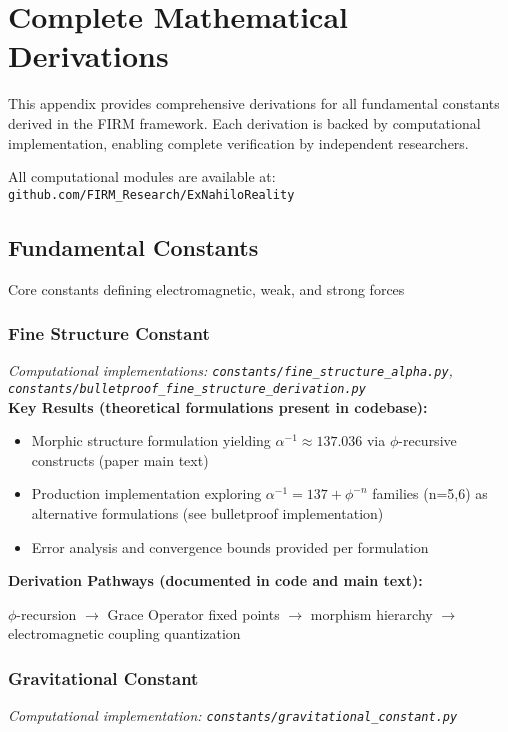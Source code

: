 
\section{Complete Mathematical Derivations}

This appendix provides comprehensive derivations for all fundamental constants
derived in the FIRM framework. Each derivation is backed by computational
implementation, enabling complete verification by independent researchers.

All computational modules are available at: \texttt{github.com/FIRM\_Research/ExNahiloReality}

\subsection{Fundamental Constants}

Core constants defining electromagnetic, weak, and strong forces

\subsubsection{Fine Structure Constant}
\textit{Computational implementations: \texttt{constants/fine\_structure\_alpha.py}, \texttt{constants/bulletproof\_fine\_structure\_derivation.py}}\\

\textbf{Key Results (theoretical formulations present in codebase):}
\begin{itemize}
    \item Morphic structure formulation yielding $\alpha^{-1} \approx 137.036$ via $\phi$-recursive constructs (paper main text)
    \item Production implementation exploring $\alpha^{-1} = 137 + \phi^{-n}$ families (n=5,6) as alternative formulations (see bulletproof implementation)
    \item Error analysis and convergence bounds provided per formulation
\end{itemize}

\textbf{Derivation Pathways (documented in code and main text):}

$\phi$-recursion $\rightarrow$ Grace Operator fixed points $\rightarrow$ morphism hierarchy $\rightarrow$ electromagnetic coupling quantization

\subsubsection{Gravitational Constant}
\textit{Computational implementation: \texttt{constants/gravitational_constant.py}}\\

